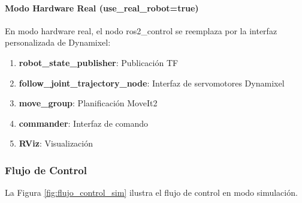 \paragraph{Modo Hardware Real (use\_real\_robot=true)}

En modo hardware real, el nodo ros2\_control se reemplaza por la interfaz personalizada de Dynamixel:

\begin{enumerate}
    \item \textbf{robot\_state\_publisher}: Publicación TF
    \item \textbf{follow\_joint\_trajectory\_node}: Interfaz de servomotores Dynamixel
    \item \textbf{move\_group}: Planificación MoveIt2
    \item \textbf{commander}: Interfaz de comando
    \item \textbf{RViz}: Visualización
\end{enumerate}

\subsubsection{Flujo de Control}

La Figura \ref{fig:flujo_control_sim} ilustra el flujo de control en modo simulación.

